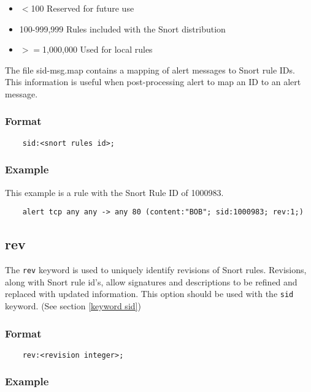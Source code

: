 \documentclass[english]{report}
\begin{document}
\begin{itemize}
\item $<$100 Reserved for future use
\item 100-999,999 Rules included with the Snort distribution
\item $>=$1,000,000 Used for local rules
\end{itemize}

The file sid-msg.map contains a mapping of alert messages to Snort rule IDs.
This information is useful when post-processing alert to map an ID to an alert
message.  

\subsubsection{Format}

\begin{verbatim}
    sid:<snort rules id>;
\end{verbatim}

\subsubsection{Example}

This example is a rule with the Snort Rule ID of 1000983.

\begin{verbatim}
    alert tcp any any -> any 80 (content:"BOB"; sid:1000983; rev:1;)
\end{verbatim}

\subsection{rev}
\label{keyword rev}

The \texttt{rev} keyword is used to uniquely identify revisions of Snort rules.
Revisions, along with Snort rule id's, allow signatures and descriptions to be
refined and replaced with updated information.  This option should be used with
the \texttt{sid} keyword.  (See section \ref{keyword sid})

\subsubsection{Format}

\begin{verbatim}
    rev:<revision integer>;
\end{verbatim}

\subsubsection{Example}
\end{document}
